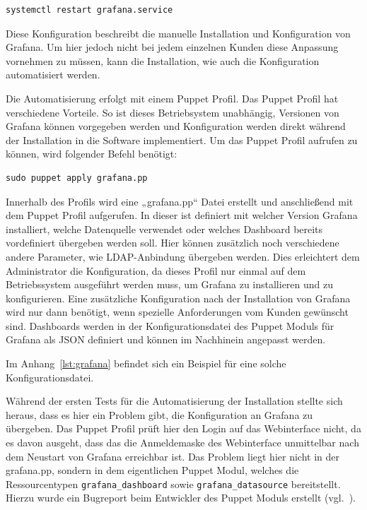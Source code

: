 {\begin{verbatim}
systemctl restart grafana.service
\end{verbatim}

Diese Konfiguration beschreibt die manuelle Installation und Konfiguration von
Grafana. Um hier jedoch nicht bei jedem einzelnen Kunden diese Anpassung
vornehmen zu müssen, kann die Installation, wie auch die Konfiguration
automatisiert werden.

Die Automatisierung erfolgt mit einem Puppet Profil. Das Puppet Profil hat
verschiedene Vorteile. So ist dieses Betriebsystem unabhängig, Versionen von
Grafana können vorgegeben werden und Konfiguration werden direkt während der
Installation in die Software implementiert. Um das Puppet Profil aufrufen zu
können, wird folgender Befehl benötigt:

\begin{verbatim}
sudo puppet apply grafana.pp
\end{verbatim}

Innerhalb des Profils wird eine „grafana.pp“ Datei erstellt und anschließend
mit dem Puppet Profil aufgerufen. In dieser ist definiert mit welcher Version
Grafana installiert, welche Datenquelle verwendet oder welches Dashboard
bereits vordefiniert übergeben werden soll. Hier können zusätzlich noch
verschiedene andere Parameter, wie LDAP\hyp{}Anbindung übergeben werden. Dies
erleichtert dem Administrator die Konfiguration, da dieses Profil nur einmal
auf dem Betriebssystem ausgeführt werden muss, um Grafana zu installieren und
zu konfigurieren. Eine zusätzliche Konfiguration nach der Installation von
Grafana wird nur dann benötigt, wenn spezielle Anforderungen vom Kunden
gewünscht sind. Dashboards werden in der Konfigurationsdatei des Puppet Moduls
für Grafana als \gls{JSON} definiert und können im Nachhinein angepasst werden.

Im Anhang~\ref{lst:grafana} befindet sich ein Beispiel für eine solche
Konfigurationsdatei.

Während der ersten Tests für die Automatisierung der Installation stellte sich
heraus, dass es hier ein Problem gibt, die Konfiguration an Grafana zu
übergeben. Das Puppet Profil prüft hier den Login auf das Webinterface nicht,
da es davon ausgeht, dass das die Anmeldemaske des Webinterface unmittelbar
nach dem Neustart von Grafana erreichbar ist. Das Problem liegt hier nicht in
der grafana.pp, sondern in dem eigentlichen Puppet Modul, welches die
Ressourcentypen \texttt{grafana\_dashboard} sowie \texttt{grafana\_datasource}
bereitstellt. Hierzu wurde ein Bugreport beim Entwickler des Puppet Moduls
erstellt (vgl.~\cite{grafana-issue}).
\mr%

}
